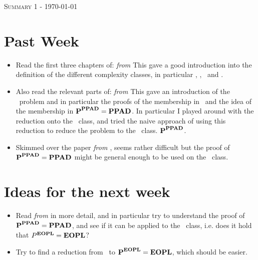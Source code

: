 \documentclass[11pt]{scrreprt}
\begin{document}
\begin{center}
    {\scshape{\Huge {Summary 1 - \today}}} \\ \vspace{5pt}
\end{center}

\section*{Past Week}

\begin{itemize}
    \item Read the first three chapters of:
          \textit{ from
              \citeauthor{hollender_structural_2021}}
          This gave a good introduction into the definition of the different
          complexity classes, in particular \TFNP, \PPAD, \PLS\ and \EOPL.
    \item Also read the relevant parts of:
          \textit{ from
              \citeauthor{etessami_tarskis_2020}}
          This gave an introduction of the \Tarski\ problem and in particular
          the proofs of the membership in \PLS\ and the idea of the membership
          in $\textbf{P}^{\textbf{PPAD}} = \textbf{PPAD}$. In particular I played around with the
          reduction onto the \PLS\ class, and tried the naive approach of using
          this
          reduction to reduce the problem to the \EOPL\ class.
          $\textbf{P}^{\textbf{PPAD}}$.
    \item Skimmed over the paper \textit{
              from
              \citeauthor{buss_propositional_2012}}, seems rather difficult but
          the proof of $\textbf{P}^{\textbf{PPAD}} = \textbf{PPAD}$ might be general enough to be used
          on the
          \EOPL\ class.
\end{itemize}

\section*{Ideas for the next week}

\begin{itemize}
    \item Read \textit{ from
              \citeauthor{buss_propositional_2012}} in more detail, and in
          particular try to understand the proof of $\textbf{P}^{\textbf{PPAD}} = \textbf{PPAD}$, and
          see if it
          can be applied to the \EOPL\ class, i.e. does it hold that $P^{\textbf{EOPL}}
              = \textbf{EOPL}$?
    \item Try to find a reduction from \Tarski\ to $\textbf{P}^{\textbf{EOPL}} = \textbf{EOPL}$, which
          should be easier.
\end{itemize}
\end{document}
